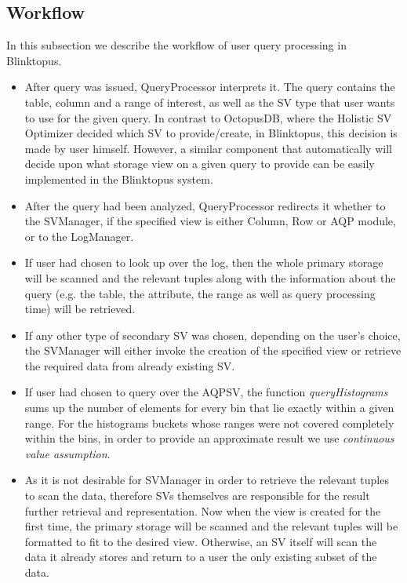 \documentclass[10pt, conference, compsocconf]{IEEEtran}
\begin{document}
\subsection{Workflow}

In this subsection we describe the workflow of user query processing in Blinktopus.
\begin{itemize}
\item{After query was issued, QueryProcessor interprets it. The query contains the table, column and a range of interest, as well as the SV type that user wants to use for the given query. In contrast to OctopusDB, where the Holistic SV Optimizer decided which SV to provide/create, in Blinktopus, this decision is made by user himself. However, a similar component that automatically will decide upon what storage view on a given query to provide can be easily implemented in the Blinktopus system.}
\item{After the query had been analyzed, QueryProcessor redirects it whether to the SVManager, if the specified view is either Column, Row or AQP module, or to the LogManager.}
\item{If user had chosen to look up over the log, then the whole primary storage will be scanned and the relevant tuples along with the information about the query (e.g. the table, the attribute, the range as well as query processing time) will be retrieved.}
\item{If any other type of secondary SV was chosen, depending on the user's choice, the SVManager will either invoke the creation of the specified view or retrieve the required data from already existing SV.}
\item{If user had chosen to query over the AQPSV, the function \textit{queryHistograms} sums up the number of elements for every bin that lie exactly within a given range. For the histograms buckets whose ranges were not covered completely within the bins, in order to provide an approximate result we use \textit{continuous value assumption}.}
\item{As it is not desirable for SVManager in order to retrieve the relevant tuples to scan the data, therefore SVs themselves are responsible for the result further retrieval and representation. Now when the view is created for the first time, the primary storage will be scanned and the relevant tuples will be formatted to fit to the desired view. Otherwise, an SV itself will scan the data it already stores and return to a user the only existing subset of the data.}

\end{itemize}
\end{document}

